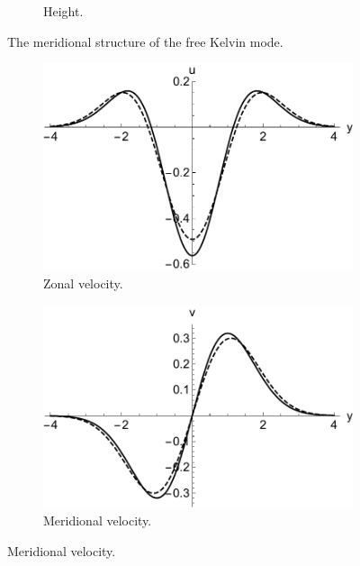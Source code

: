 \begin{figure}
\begin{subfigure}[b]{0.33\textwidth}
    \caption{Height.}
    \label{fig:free-h-shear-kelvin}
  \end{subfigure}
  \caption{The meridional structure of the free Kelvin mode.}
  \label{fig:free-shear-meridional-kelvin}
\end{figure}

\begin{figure}
  \begin{subfigure}[b]{0.33\textwidth}
    \includegraphics[width=\textwidth]{figures/wave-mean-flow/free-u-shear.pdf}
    \caption{Zonal velocity.}
    \label{fig:free-u-shear}
  \end{subfigure}
  \begin{subfigure}[b]{0.33\textwidth}
    \includegraphics[width=\textwidth]{figures/wave-mean-flow/free-v-shear.pdf}
    \caption{Meridional velocity.}
    \label{fig:free-v-shear}
  \end{subfigure}

\end{figure}
